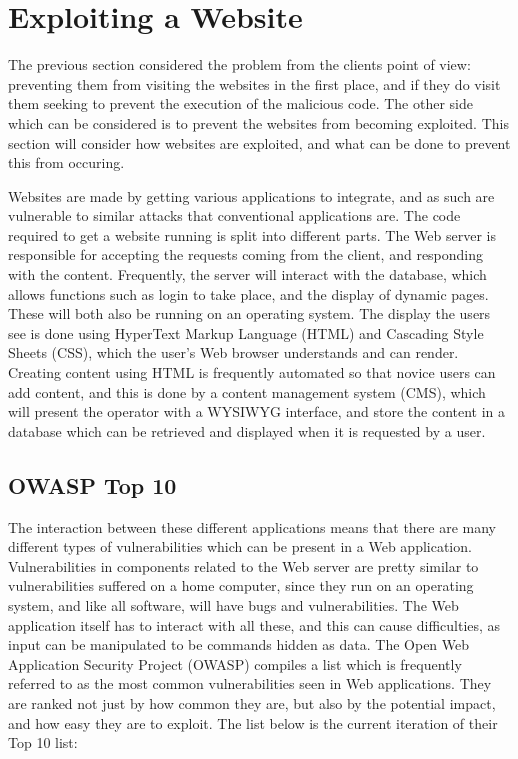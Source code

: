 \documentclass{acm_proc_article-sp}
\begin{document}
\section{Exploiting a Website}
\label{sec:exploitation}
The previous section considered the problem from the clients point of view: preventing them from visiting the websites in the first place, and if they do visit them seeking to prevent the execution of the malicious code.  The other side which can be considered is to prevent the websites from becoming exploited.  This section will consider how websites are exploited, and what can be done to prevent this from occuring.

Websites are made by getting various applications to integrate, and as such are vulnerable to similar attacks that conventional applications are.  The code required to get a website running is split into different parts.  The Web server is responsible for accepting the requests coming from the client, and responding with the content.  Frequently, the server will interact with the database, which allows functions such as login to take place, and the display of dynamic pages.  These will both also be running on an operating system.  The display the users see is done using HyperText Markup Language (HTML) and Cascading Style Sheets (CSS), which the user's Web browser understands and can render.  Creating content using HTML is frequently automated so that novice users can add content, and this is done by a content management system (CMS), which will present the operator with a WYSIWYG interface, and store the content in a database which can be retrieved and displayed when it is requested by a user.

\subsection{OWASP Top 10}
The interaction between these different applications means that there are many different types of vulnerabilities which can be present in a Web application.  Vulnerabilities in components related to the Web server are pretty similar to vulnerabilities suffered on a home computer, since they run on an operating system, and like all software, will have bugs and vulnerabilities.  The Web application itself has to interact with all these, and this can cause difficulties, as input can be manipulated to be commands hidden as data.  The Open Web Application Security Project (OWASP) compiles a list which is frequently referred to as the most common vulnerabilities seen in Web applications.  They are ranked not just by how common they are, but also by the potential impact, and how easy they are to exploit.  The list below is the current iteration of their Top 10 list:
\end{document}

